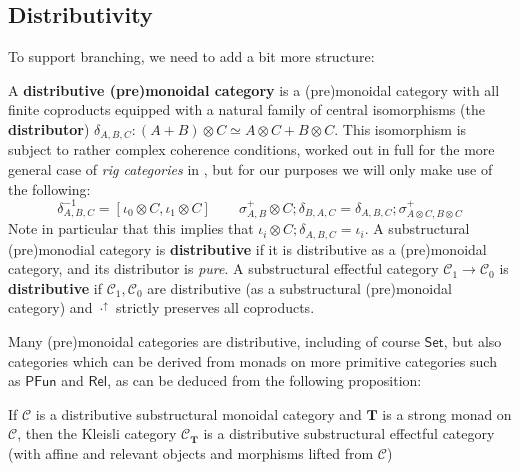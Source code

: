 \documentclass[acmsmall,screen,review]{acmart}
\newcommand{\mc}[1]{\ensuremath{\mathcal{#1}}}
\newcommand{\mb}[1]{\ensuremath{\mathbf{#1}}}
\newcommand{\ms}[1]{\ensuremath{\mathsf{#1}}}
\newcommand{\upg}[2]{{#1}^{\uparrow #2}}
\begin{document}
\subsection{Distributivity}

To support branching, we need to add a bit more structure:
\begin{definition} 
  A \textbf{distributive (pre)monoidal category} is a (pre)monoidal category
  with all finite coproducts equipped with a natural family of central
  isomorphisms (the \textbf{distributor}) \(\delta_{A, B, C}: (A + B) \otimes C
  \simeq A \otimes C + B \otimes C\). This isomorphism is subject to rather
  complex coherence conditions, worked out in full for the more general case of
  \textit{rig categories} in \cite{laplaza-distributivity}, but for our purposes
  we will only make use of the following:
  \begin{equation*}
    \delta_{A, B, C}^{-1} = [\iota_0 \otimes C, \iota_1 \otimes C] 
    \qquad
    \sigma^+_{A, B} \otimes C;\delta_{B, A, C} = \delta_{A, B, C};\sigma^+_{A \otimes C, B \otimes C}
  \end{equation*}
  Note in particular that this implies that \(\iota_i \otimes C;\delta_{A, B, C}
  = \iota_i\). A substructural (pre)monodial category is \textbf{distributive}
  if it is distributive as a (pre)monoidal category, and its distributor is
  \textit{pure}. A substructural effectful category \(\mc{C}_1 \to \mc{C}_0\) is
  \textbf{distributive} if \(\mc{C}_1, \mc{C}_0\) are distributive (as a
  substructural (pre)monoidal category) and \(\upg{\cdot}{}\) strictly preserves
  all coproducts.
\end{definition}
Many (pre)monoidal categories are distributive, including of course
\(\ms{Set}\), but also categories which can be derived from monads on more
primitive categories such as \(\ms{PFun}\) and \(\ms{Rel}\), as can be deduced
from the following proposition:
\begin{proposition}
  If \(\mc{C}\) is a distributive substructural monoidal category and \(\mb{T}\)
  is a strong monad on \(\mc{C}\), then the Kleisli category \(\mc{C}_{\mb{T}}\)
  is a distributive substructural effectful category (with affine and relevant
  objects and morphisms lifted from \(\mc{C}\))
\end{proposition}
\end{document}
